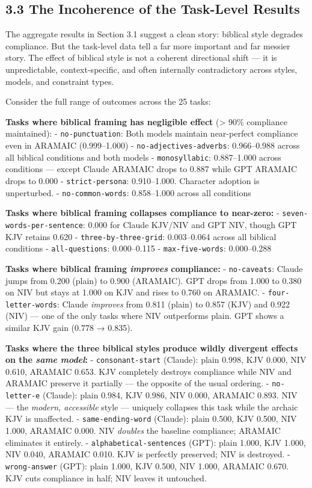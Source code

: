 \documentclass[10pt, letterpaper, twocolumn]{article}
\begin{document}
\subsection*{3.3 The Incoherence of the Task-Level Results}\label{the-incoherence-of-the-task-level-results}

The aggregate results in Section 3.1 suggest a clean story: biblical style degrades compliance. But the task-level data tell a far more important and far messier story. The effect of biblical style is not a coherent directional shift --- it is unpredictable, context-specific, and often internally contradictory across styles, models, and constraint types.

Consider the full range of outcomes across the 25 tasks:

\textbf{Tasks where biblical framing has negligible effect} (\textgreater{} 90\% compliance maintained): - \texttt{no-punctuation}: Both models maintain near-perfect compliance even in ARAMAIC (0.999--1.000) - \texttt{no-adjectives-adverbs}: 0.966--0.988 across all biblical conditions and both models - \texttt{monosyllabic}: 0.887--1.000 across conditions --- except Claude ARAMAIC drops to 0.887 while GPT ARAMAIC drops to 0.000 - \texttt{strict-persona}: 0.910--1.000. Character adoption is unperturbed. - \texttt{no-common-words}: 0.858--1.000 across all conditions

\textbf{Tasks where biblical framing collapses compliance to near-zero:} - \texttt{seven-words-per-sentence}: 0.000 for Claude KJV/NIV and GPT NIV, though GPT KJV retains 0.620 - \texttt{three-by-three-grid}: 0.003--0.064 across all biblical conditions - \texttt{all-questions}: 0.000--0.115 - \texttt{max-five-words}: 0.000--0.288

\textbf{Tasks where biblical framing \emph{improves} compliance:} - \texttt{no-caveats}: Claude jumps from 0.200 (plain) to 0.900 (ARAMAIC). GPT drops from 1.000 to 0.380 on NIV but stays at 1.000 on KJV and rises to 0.760 on ARAMAIC. - \texttt{four-letter-words}: Claude \emph{improves} from 0.811 (plain) to 0.857 (KJV) and 0.922 (NIV) --- one of the only tasks where NIV outperforms plain. GPT shows a similar KJV gain (0.778 → 0.835).

\textbf{Tasks where the three biblical styles produce wildly divergent effects on the \emph{same model}:} - \texttt{consonant-start} (Claude): plain 0.998, KJV 0.000, NIV 0.610, ARAMAIC 0.653. KJV completely destroys compliance while NIV and ARAMAIC preserve it partially --- the opposite of the usual ordering. - \texttt{no-letter-e} (Claude): plain 0.984, KJV 0.986, NIV 0.000, ARAMAIC 0.893. NIV --- the \emph{modern, accessible} style --- uniquely collapses this task while the archaic KJV is unaffected. - \texttt{same-ending-word} (Claude): plain 0.500, KJV 0.500, NIV 1.000, ARAMAIC 0.000. NIV \emph{doubles} the baseline compliance; ARAMAIC eliminates it entirely. - \texttt{alphabetical-sentences} (GPT): plain 1.000, KJV 1.000, NIV 0.040, ARAMAIC 0.010. KJV is perfectly preserved; NIV is destroyed. - \texttt{wrong-answer} (GPT): plain 1.000, KJV 0.500, NIV 1.000, ARAMAIC 0.670. KJV cuts compliance in half; NIV leaves it untouched.
\end{document}
